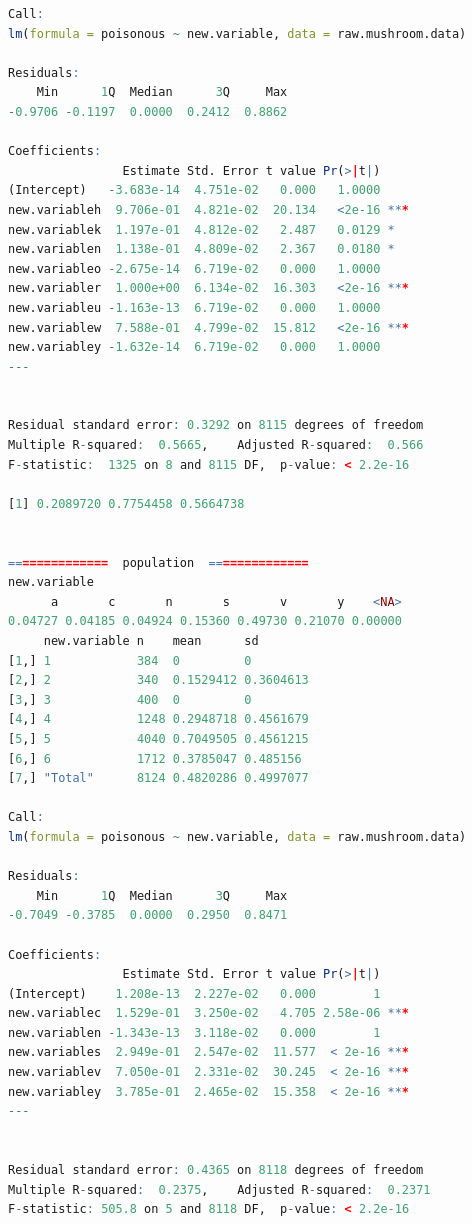 \documentclass[12pt]{article}
\begin{document}
\begin{lstlisting}[language = R]
Call:
lm(formula = poisonous ~ new.variable, data = raw.mushroom.data)

Residuals:
    Min      1Q  Median      3Q     Max 
-0.9706 -0.1197  0.0000  0.2412  0.8862 

Coefficients:
                Estimate Std. Error t value Pr(>|t|)    
(Intercept)   -3.683e-14  4.751e-02   0.000   1.0000    
new.variableh  9.706e-01  4.821e-02  20.134   <2e-16 ***
new.variablek  1.197e-01  4.812e-02   2.487   0.0129 *  
new.variablen  1.138e-01  4.809e-02   2.367   0.0180 *  
new.variableo -2.675e-14  6.719e-02   0.000   1.0000    
new.variabler  1.000e+00  6.134e-02  16.303   <2e-16 ***
new.variableu -1.163e-13  6.719e-02   0.000   1.0000    
new.variablew  7.588e-01  4.799e-02  15.812   <2e-16 ***
new.variabley -1.632e-14  6.719e-02   0.000   1.0000    
---


Residual standard error: 0.3292 on 8115 degrees of freedom
Multiple R-squared:  0.5665,	Adjusted R-squared:  0.566 
F-statistic:  1325 on 8 and 8115 DF,  p-value: < 2.2e-16

[1] 0.2089720 0.7754458 0.5664738


==============  population  ==============
new.variable
      a       c       n       s       v       y    <NA> 
0.04727 0.04185 0.04924 0.15360 0.49730 0.21070 0.00000 
     new.variable n    mean      sd       
[1,] 1            384  0         0        
[2,] 2            340  0.1529412 0.3604613
[3,] 3            400  0         0        
[4,] 4            1248 0.2948718 0.4561679
[5,] 5            4040 0.7049505 0.4561215
[6,] 6            1712 0.3785047 0.485156 
[7,] "Total"      8124 0.4820286 0.4997077

Call:
lm(formula = poisonous ~ new.variable, data = raw.mushroom.data)

Residuals:
    Min      1Q  Median      3Q     Max 
-0.7049 -0.3785  0.0000  0.2950  0.8471 

Coefficients:
                Estimate Std. Error t value Pr(>|t|)    
(Intercept)    1.208e-13  2.227e-02   0.000        1    
new.variablec  1.529e-01  3.250e-02   4.705 2.58e-06 ***
new.variablen -1.343e-13  3.118e-02   0.000        1    
new.variables  2.949e-01  2.547e-02  11.577  < 2e-16 ***
new.variablev  7.050e-01  2.331e-02  30.245  < 2e-16 ***
new.variabley  3.785e-01  2.465e-02  15.358  < 2e-16 ***
---


Residual standard error: 0.4365 on 8118 degrees of freedom
Multiple R-squared:  0.2375,	Adjusted R-squared:  0.2371 
F-statistic: 505.8 on 5 and 8118 DF,  p-value: < 2.2e-16


\end{lstlisting}
\end{document}
